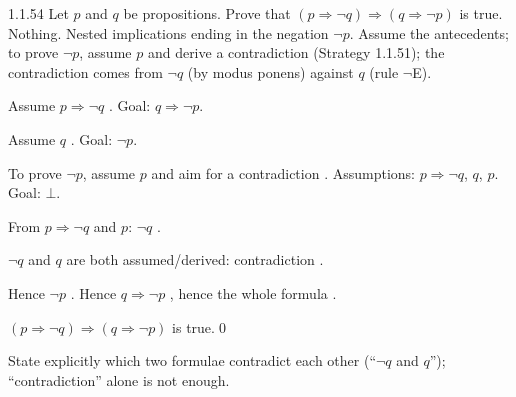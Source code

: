 \begin{bookex}[recommended]{1.1.54}
Let $p$ and $q$ be propositions. Prove that $(p\Rightarrow\neg q)\Rightarrow(q\Rightarrow\neg p)$ is true.
\solution
\given Nothing.
\goal Nested implications ending in the negation $\neg p$.
\plan Assume the antecedents; to prove $\neg p$, assume $p$ and derive a contradiction (Strategy 1.1.51); the contradiction comes from $\neg q$ (by modus ponens) against $q$ (rule $\neg$E).
\begin{steps}
\item Assume $p\Rightarrow\neg q$ . Goal: $q\Rightarrow\neg p$.
\item Assume $q$ . Goal: $\neg p$.
\item To prove $\neg p$, assume $p$ and aim for a contradiction . Assumptions: $p\Rightarrow\neg q$, $q$, $p$. Goal: $\bot$.
\item From $p\Rightarrow\neg q$ and $p$: $\neg q$ .
\item $\neg q$ and $q$ are both assumed/derived: contradiction .
\item Hence $\neg p$ . Hence $q\Rightarrow\neg p$ , hence the whole formula .
\end{steps}
\conclusion $(p\Rightarrow\neg q)\Rightarrow(q\Rightarrow\neg p)$ is true.\qed
\begin{compare}
\item State explicitly which two formulae contradict each other (``$\neg q$ and $q$''); ``contradiction'' alone is not enough.
\end{compare}
\end{bookex}

